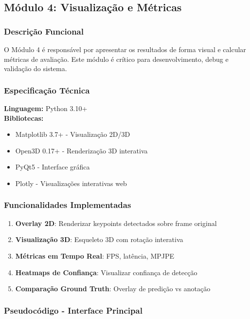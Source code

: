 \documentclass[12pt, a4paper]{article}
\begin{document}
\subsection{Módulo 4: Visualização e Métricas}

\subsubsection{Descrição Funcional}

O Módulo 4 é responsável por apresentar os resultados de forma visual e calcular métricas de avaliação. Este módulo é crítico para desenvolvimento, debug e validação do sistema.

\subsubsection{Especificação Técnica}

\textbf{Linguagem:} Python 3.10+\\
\textbf{Bibliotecas:}
\begin{itemize}
    \item Matplotlib 3.7+ - Visualização 2D/3D
    \item Open3D 0.17+ - Renderização 3D interativa
    \item PyQt5 - Interface gráfica
    \item Plotly - Visualizações interativas web
\end{itemize}

\subsubsection{Funcionalidades Implementadas}

\begin{enumerate}
    \item \textbf{Overlay 2D}: Renderizar keypoints detectados sobre frame original
    \item \textbf{Visualização 3D}: Esqueleto 3D com rotação interativa
    \item \textbf{Métricas em Tempo Real}: FPS, latência, MPJPE
    \item \textbf{Heatmaps de Confiança}: Visualizar confiança de detecção
    \item \textbf{Comparação Ground Truth}: Overlay de predição vs anotação
\end{enumerate}

\subsubsection{Pseudocódigo - Interface Principal}
\end{document}
